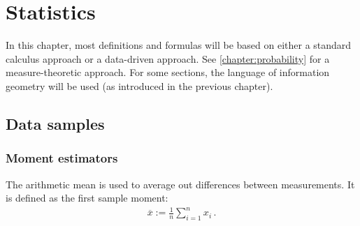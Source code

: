 \chapter{Statistics}\label{chapter:statistics}

    In this chapter, most definitions and formulas will be based on either a standard calculus approach or a data-driven approach. See \cref{chapter:probability} for a measure-theoretic approach. For some sections, the language of information geometry will be used (as introduced in the previous chapter).

\section{Data samples}
\subsection{Moment estimators}

    \begin{example}\label{statistics:arithmetic_mean}
        The arithmetic mean is used to average out differences between measurements. It is defined as the first sample moment:
        \begin{gather}
            \overline{x} := \frac{1}{n}\sum_{i=1}^nx_i\,.
        \end{gather}
    \end{example}

